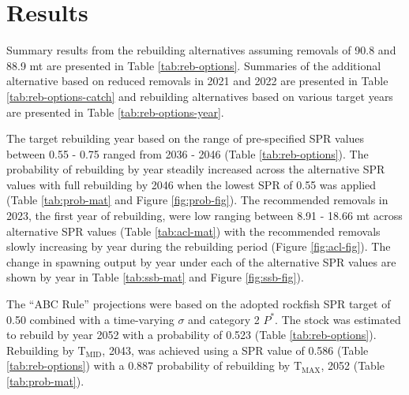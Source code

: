\documentclass[11pt,
  english,
  a4paper,
]{article}
\begin{document}
\leavevmode\tagmcend\tagstructend\par


\hypertarget{results}{%
\section{Results}\label{results}}

\leavevmode\tagmcend\tagstructend


Summary results from the rebuilding alternatives assuming removals of 90.8 and 88.9 mt are presented in Table \ref{tab:reb-options}. Summaries of the additional alternative based on reduced removals in 2021 and 2022 are presented in Table \ref{tab:reb-options-catch} and rebuilding alternatives based on various target years are presented in Table \ref{tab:reb-options-year}.

\leavevmode\tagmcend\tagstructend\par


The target rebuilding year based on the range of pre-specified SPR values between 0.55 - 0.75 ranged from 2036 - 2046 (Table \ref{tab:reb-options}). The probability of rebuilding by year steadily increased across the alternative SPR values with full rebuilding by 2046 when the lowest SPR of 0.55 was applied (Table \ref{tab:prob-mat} and Figure \ref{fig:prob-fig}). The recommended removals in 2023, the first year of rebuilding, were low ranging between 8.91 - 18.66 mt across alternative SPR values (Table \ref{tab:acl-mat}) with the recommended removals slowly increasing by year during the rebuilding period (Figure \ref{fig:acl-fig}). The change in spawning output by year under each of the alternative SPR values are shown by year in Table \ref{tab:ssb-mat} and Figure \ref{fig:ssb-fig}).

\leavevmode\tagmcend\tagstructend\par


The ``ABC Rule'' projections were based on the adopted rockfish SPR target of 0.50 combined with a time-varying {\(\sigma\)\leavevmode\tagmcend\tagstructend} and category 2 {\(P^*\)\leavevmode\tagmcend\tagstructend}. The stock was estimated to rebuild by year 2052 with a probability of 0.523 (Table \ref{tab:reb-options}). Rebuilding by {\(\text{T}_\text{MID}\)\leavevmode\tagmcend\tagstructend}, 2043, was achieved using a SPR value of 0.586 (Table \ref{tab:reb-options}) with a 0.887 probability of rebuilding by {\(\text{T}_\text{MAX}\)\leavevmode\tagmcend\tagstructend}, 2052 (Table \ref{tab:prob-mat}).
\end{document}
